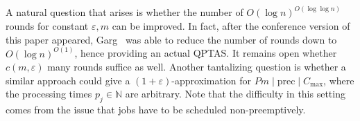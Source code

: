 \documentclass[11pt,letterpaper,oneside,english]{article}
\theoremstyle{theorem}
\providecommand{\setN}{\mathbb{N}}
\begin{document}
A natural question that arises is whether the number of $O(\log n)^{O(\log \log n)}$
rounds for constant $\varepsilon,m$ can be improved. In fact, after the conference version of this
paper appeared, Garg~\cite{QPTAS-Scheduling-GargArxiv2017} was able to reduce the number of rounds down 
to $O(\log n)^{O(1)}$, hence providing an actual QPTAS. It remains open whether $c(m,\varepsilon)$ many rounds
suffice as well. Another tantalizing question is whether a similar approach could give a $(1+\varepsilon)$-approximation for $Pm \mid \textrm{prec} \mid C_{\max}$, where the processing times $p_j \in \setN$ are arbitrary. Note that the
difficulty in this setting comes from the issue that jobs have to be scheduled non-preemptively.

\begin{comment}
Note that the recursive applications 
It remains to put all pieces together and show the claim of our main result, which is Theorem~\ref{thm:MainTechnicalTheorem}. Recall from Section~\ref{sec:Overview} that it suffices to prove Lemma~\ref{lem:MainRecursiveAlgorithm}.

\begin{proof}[Proof of Lemma~\ref{lem:MainRecursiveAlgorithm}]

Set $k = \frac{c_1m}{\varepsilon}\log \log (T)$ as described in Appendix~\ref{sec:AccountingDiscardedJobs}, so that in each iteration of the recursive algorithm we are dealing with $k^2 = (\frac{c_1m}{\varepsilon}\log \log (T))^2$ levels of intervals. 

Now on Step 1, we let $\delta = \frac{\varepsilon}{k^2m 2^{2k^2}\log(T)}$ so that the first $k^2$ levels have no chains longer than $k^2\frac{\varepsilon}{k^2m 2^{2k^2}\log(T)} \cdot |I| \leq \frac{\varepsilon}{m 2^{2k^2}\log(T)} \cdot T^*$ jobs after conditioning at most 
\begin{eqnarray*}
2mk^2 \cdot \frac{2^{k^2}}{\delta} &= 2mk^2 \cdot {2^{k^2}} \cdot \frac{k^2m 2^{2k^2}\log(T)}{\varepsilon} =\frac{2m^2}{\varepsilon} \cdot k^4 \cdot 2^{3k^2}\cdot \log (T)\\
&=\frac{2m^2}{\varepsilon} \cdot (\frac{c_1m}{\varepsilon}\log \log (T))^4 \cdot 2^{(3(\frac{c_1m}{\varepsilon}\log \log (T))^2)}\cdot \log (T)\\
&=\frac{2c_1^2m^6}{\varepsilon^5} (\log\ T)^{(3\frac{c_1^2m^2}{\varepsilon^2}\log\log (T) +1)} (\log\log(T))^4
\end{eqnarray*}
many times.

Notice that because we choose $\ell^* \in \{k,\ldots,k^2\}$, we will run this step at most $\frac{\log (T^*)}{k} = \frac{\varepsilon \log(T^*)}{c_1m\log \log (T)}$ times. Then in total we use at most 
\[
\frac{2c_1m^5}{\varepsilon^4} (\log (T))^{(3\frac{c_1^2m^2}{\varepsilon^2}\log\log (T) +1)} \log\log(T)^3 \log (T^*)
\] 
levels of the hierarchy. 


\end{comment}
\end{document}
